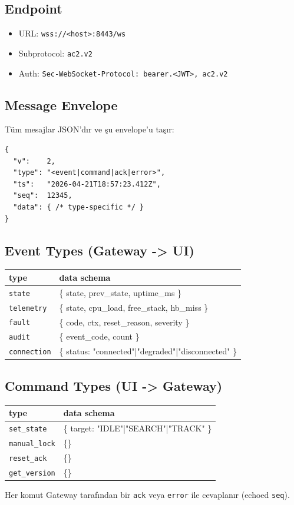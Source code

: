 \documentclass[11pt, a4paper]{article}
\begin{document}
\subsection{Endpoint}
\begin{itemize}
    \item URL: \texttt{wss://<host>:8443/ws}
    \item Subprotocol: \texttt{ac2.v2}
    \item Auth: \texttt{Sec-WebSocket-Protocol: bearer.<JWT>, ac2.v2}
\end{itemize}

\subsection{Message Envelope}
Tüm mesajlar JSON'dır ve şu envelope'u taşır:
\begin{lstlisting}
{
  "v":    2,
  "type": "<event|command|ack|error>",
  "ts":   "2026-04-21T18:57:23.412Z",
  "seq":  12345,
  "data": { /* type-specific */ }
}
\end{lstlisting}

\subsection{Event Types (Gateway -> UI)}
\begin{tabularx}{\textwidth}{|l|X|}
\hline
\textbf{type} & \textbf{data schema} \\
\hline
\texttt{state}      & \{ state, prev\_state, uptime\_ms \} \\
\texttt{telemetry}  & \{ state, cpu\_load, free\_stack, hb\_miss \} \\
\texttt{fault}      & \{ code, ctx, reset\_reason, severity \} \\
\texttt{audit}      & \{ event\_code, count \} \\
\texttt{connection} & \{ status: "connected"|"degraded"|"disconnected" \} \\
\hline
\end{tabularx}

\subsection{Command Types (UI -> Gateway)}
\begin{tabularx}{\textwidth}{|l|X|}
\hline
\textbf{type} & \textbf{data schema} \\
\hline
\texttt{set\_state}   & \{ target: "IDLE"|"SEARCH"|"TRACK" \} \\
\texttt{manual\_lock} & \{\} \\
\texttt{reset\_ack}   & \{\} \\
\texttt{get\_version} & \{\} \\
\hline
\end{tabularx}
Her komut Gateway tarafından bir \texttt{ack} veya \texttt{error} ile cevaplanır (echoed \texttt{seq}).
\end{document}
